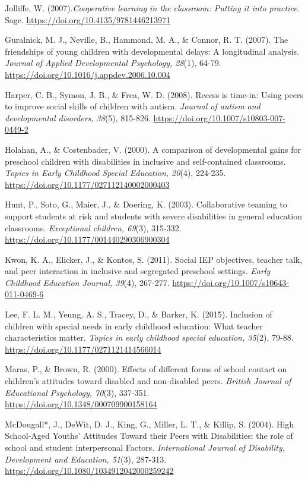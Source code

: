 \documentclass[11.5pt]{sig-alternate}
\begin{document}
\begin{large}
Jolliffe, W. (2007).\textit{Cooperative learning in the classroom: Putting it into practice}. Sage. \url{https://doi.org/10.4135/9781446213971}

Guralnick, M. J., Neville, B., Hammond, M. A., \& Connor, R. T. (2007). The friendships of young children with developmental delays: A longitudinal analysis. \textit{Journal of Applied Developmental Psychology, 28}(1), 64-79. \url{https://doi.org/10.1016/j.appdev.2006.10.004}

Harper, C. B., Symon, J. B., \& Frea, W. D. (2008). Recess is time-in: Using peers to improve social skills of children with autism. \textit{Journal of autism and developmental disorders, 38}(5), 815-826. \url{https://doi.org/10.1007/s10803-007-0449-2}

Holahan, A., \& Costenbader, V. (2000). A comparison of developmental gains for pre\-school children with disabilities in inclusive and self-contained classrooms. \textit{Topics in Early Childhood Special Education, 20}(4), 224-235. \url{https://doi.org/10.1177/027112140002000403}

Hunt, P., Soto, G., Maier, J., \& Doering, K. (2003). Collaborative teaming to support students at risk and students with severe disabilities in general education classrooms. \textit{Exceptional children, 69}(3), 315-332. \url{https://doi.org/10.1177/001440290306900304} 

Kwon, K. A., Elicker, J., \& Kontos, S. (2011). Social IEP objectives, teacher talk, and peer interaction in inclusive and segregated pre\-school settings. \textit{Early Childhood Education Journal, 39}(4), 267-277. \url{https://doi.org/10.1007/s10643-011-0469-6}

Lee, F. L. M., Yeung, A. S., Tracey, D., \& Barker, K. (2015). Inclusion of children with special needs in early childhood education: What teacher characteristics matter. \textit{Topics in early childhood special education, 35}(2), 79-88. \url{https://doi.org/10.1177/0271121414566014}

Maras, P., \& Brown, R. (2000). Effects of different forms of school contact on children's attitudes toward disabled and non‐disabled peers. \textit{British Journal of Educational Psychology, 70}(3), 337-351. \url{https://doi.org/10.1348/000709900158164}

McDougall*, J., DeWit, D. J., King, G., Miller, L. T., \& Killip, S. (2004). High School‐Aged Youths' Attitudes Toward their Peers with Disabilities: the role of school and student interpersonal Factors. \textit{International Journal of Disability, Development and Education, 51}(3), 287-313. \url{https://doi.org/10.1080/1034912042000259242}


\end{large}
\end{document}
